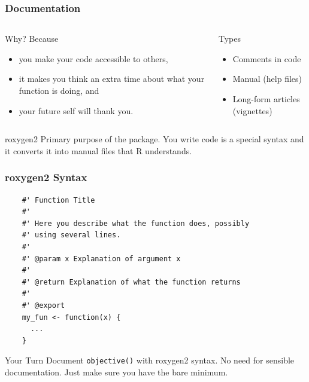 \documentclass[aspectratio=1610,onlytextwidth]{beamer}
\begin{document}
\begin{frame}[c]
  \frametitle{Documentation}

  \begin{columns}[T]
    \begin{column}{0.45\textwidth}
      \begin{block}{Why?}
        Because
        \begin{itemize}[<+->]
          \item you make your code accessible to others,
          \item it makes you think an extra time about what your function is doing, and
          \item your future self will thank you.
        \end{itemize}
      \end{block}
    \end{column}
    \medskip\pause

    \begin{column}{0.45\textwidth}
      \begin{block}{Types}
        \begin{itemize}
          \item Comments in code
          \item Manual (help files)
          \item Long-form articles (vignettes)
        \end{itemize}
      \end{block}
    \end{column}
  \end{columns}

  \begin{block}{roxygen2}
    Primary purpose of the package. You write code is a special syntax
    and it converts it into manual files that R understands.
  \end{block}

\end{frame}

\begin{frame}[c,fragile]
  \frametitle{roxygen2 Syntax}
  \begin{lstlisting}
    #' Function Title
    #' 
    #' Here you describe what the function does, possibly 
    #' using several lines.
    #' 
    #' @param x Explanation of argument x
    #'
    #' @return Explanation of what the function returns
    #'
    #' @export
    my_fun <- function(x) {
      ...
    }
  \end{lstlisting}

  \pause

  \begin{block}{Your Turn}
    Document \lstinline{objective()} with roxygen2 syntax. No need for
    sensible documentation. Just make sure you have the bare minimum.
  \end{block}

\end{frame}
\end{document}

